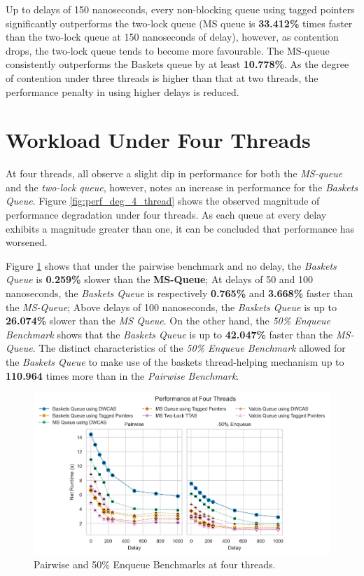 Up to delays of 150 nanoseconds, every non-blocking queue using tagged
pointers significantly outperforms the two-lock queue (MS queue is
\textbf{33.412\%} times faster than the two-lock queue at 150 nanoseconds of
delay), however, as contention drops, the two-lock queue tends to become more
favourable. The MS-queue consistently outperforms the Baskets queue by at least
\textbf{10.778\%}. As the degree of contention under three threads is
higher than that at two threads, the performance penalty in using higher delays
is reduced.

\section{Workload Under Four Threads\label{sec:workload_four_threads}}

At four threads,
\citep{michael1996simple,hoffman2007baskets,ladan2008optimistic} all observe a
slight dip in performance for both the \emph{MS-queue} and the \emph{two-lock
queue}, however, \citeauthor{hoffman2007baskets} notes an increase in
performance for the \emph{Baskets Queue}. 
Figure \ref{fig:perf_deg_4_thread} shows the observed magnitude of performance
degradation under four threads. As each queue at every
delay exhibits a magnitude greater than one, it can be concluded that
performance has worsened.

Figure \ref{fig:perf_4_thread} shows that under the pairwise benchmark and no
delay, the \emph{Baskets Queue} is \textbf{0.259\%} slower than the \textbf{MS-Queue};
At delays of 50 and 100 nanoseconds, the \emph{Baskets Queue} is
respectively \textbf{0.765\%} and \textbf{3.668\%} faster than the
\emph{MS-Queue}; Above delays of 100 nanoseconds, the \emph{Baskets Queue} is
up to \textbf{26.074\%} slower than the \emph{MS Queue}. 
On the other hand, the \emph{50\% Enqueue Benchmark} shows that the
\emph{Baskets Queue} is up to \textbf{42.047\%} faster than the
\emph{MS-Queue}. The distinct characteristics of the \emph{50\% Enqueue
Benchmark} allowed for the \emph{Baskets Queue} to make use of the baskets
thread-helping mechanism up to \textbf{110.964} times more than in the
\emph{Pairwise Benchmark}.

\begin{figure}[!ht]
    \centering
    \includegraphics[width=1\textwidth]{images/plots/delay_thread_4.jpg}
    \caption{Pairwise and 50\% Enqueue Benchmarks at four threads.}
    \label{fig:perf_4_thread}
\end{figure}

